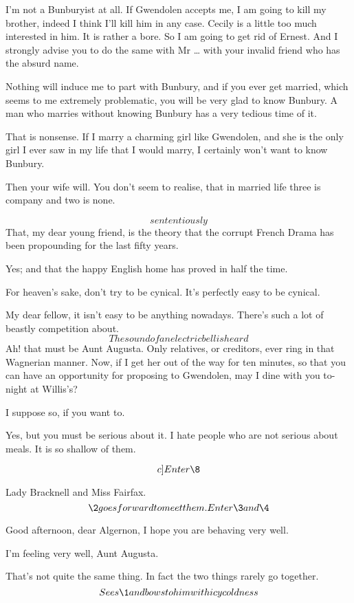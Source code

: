 \documentclass{book}
\begin{document}
\1  I'm not a Bunburyist at all.  If Gwendolen accepts me, I am
going to kill my brother, indeed I think I'll kill him in any case.
Cecily is a little too much interested in him.  It is rather a
bore.  So I am going to get rid of Ernest.  And I strongly advise
you to do the same with Mr \ldots{} with your invalid friend who has
the absurd name.

\2  Nothing will induce me to part with Bunbury, and if you
ever get married, which seems to me extremely problematic, you will
be very glad to know Bunbury.  A man who marries without knowing
Bunbury has a very tedious time of it.

\1  That is nonsense.  If I marry a charming girl like
Gwendolen, and she is the only girl I ever saw in my life that I
would marry, I certainly won't want to know Bunbury.

\2  Then your wife will.  You don't seem to realise, that in
married life three is company and two is none.

\1  \[sententiously\]  That, my dear young friend, is the theory
that the corrupt French Drama has been propounding for the last
fifty years.

\2  Yes; and that the happy English home has proved in half
the time.

\1  For heaven's sake, don't try to be cynical.  It's perfectly
easy to be cynical.

\2  My dear fellow, it isn't easy to be anything nowadays.
There's such a lot of beastly competition about.  \[The sound of an
electric bell is heard\]  Ah! that must be Aunt Augusta.  Only
relatives, or creditors, ever ring in that Wagnerian manner.  Now,
if I get her out of the way for ten minutes, so that you can have
an opportunity for proposing to Gwendolen, may I dine with you
to-night at Willis's?

\1  I suppose so, if you want to.

\2  Yes, but you must be serious about it.  I hate people
who are not serious about meals.  It is so shallow of them.

\[c]Enter \8\]

\8 Lady Bracknell and Miss Fairfax.
\newpage
\[\2 goes forward to meet them.  Enter \3 and
\4\]

\3  Good afternoon, dear Algernon, I hope you are
behaving very well.

\2  I'm feeling very well, Aunt Augusta.

\3  That's not quite the same thing.  In fact the two
things rarely go together.  \[Sees \1 and bows to him with icy
coldness\]
\end{document}
